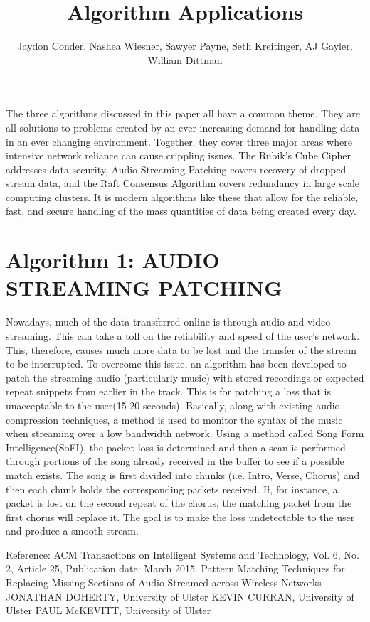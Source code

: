 \documentclass[11pt]{article}
\title{Algorithm Applications} %
\author{Jaydon Conder, Nashea Wiesner, Sawyer Payne, Seth Kreitinger, AJ Gayler, William Dittman}
\begin{document}
\maketitle

The three algorithms discussed in this paper all have a common theme. They are all solutions to problems created by an ever increasing demand for handling data in an ever changing environment. Together, they cover three major areas where intensive network reliance can cause crippling issues. The Rubik’s Cube Cipher addresses data security, Audio Streaming Patching covers recovery of dropped stream data, and the Raft Consensus Algorithm covers redundancy in large scale computing clusters. It is modern algorithms like these that allow for the reliable, fast, and secure handling of the mass quantities of data being created every day. 

\section{Algorithm 1: AUDIO STREAMING PATCHING}
Nowadays, much of the data transferred online is through audio and video streaming. This can take a toll on the
reliability and speed of the user's network.  This, therefore, causes much more data to be lost and the transfer 
of the stream to be interrupted.  To overcome this issue, an algorithm has been developed to patch the streaming
audio (particularly music) with stored recordings or expected repeat snippets from earlier in the track.  This 
is for patching a loss that is unacceptable to the user(15-20 seconds).  Basically, along with existing audio compression 
techniques, a method is used to monitor the syntax of the music when streaming over a low bandwidth network.  
Using a method called Song Form Intelligence(SoFI), the packet loss is determined and then a scan is performed through portions of the song already received in the buffer to see if a possible match exists.  The song is first divided into chunks (i.e. 
Intro, Verse, Chorus)  and then each chunk holds the corresponding packets received.  If, for instance, a packet is lost 
on the second repeat of the chorus, the matching packet from the first chorus will replace it.  The goal is to make
the loss undetectable to the user and produce a smooth stream.

Reference: ACM Transactions on Intelligent Systems and Technology, Vol. 6, No. 2, Article 25, Publication date: March 2015.
Pattern Matching Techniques for Replacing Missing Sections of
Audio Streamed across Wireless Networks
JONATHAN DOHERTY, University of Ulster
KEVIN CURRAN, University of Ulster
PAUL McKEVITT, University of Ulster
\end{document}
